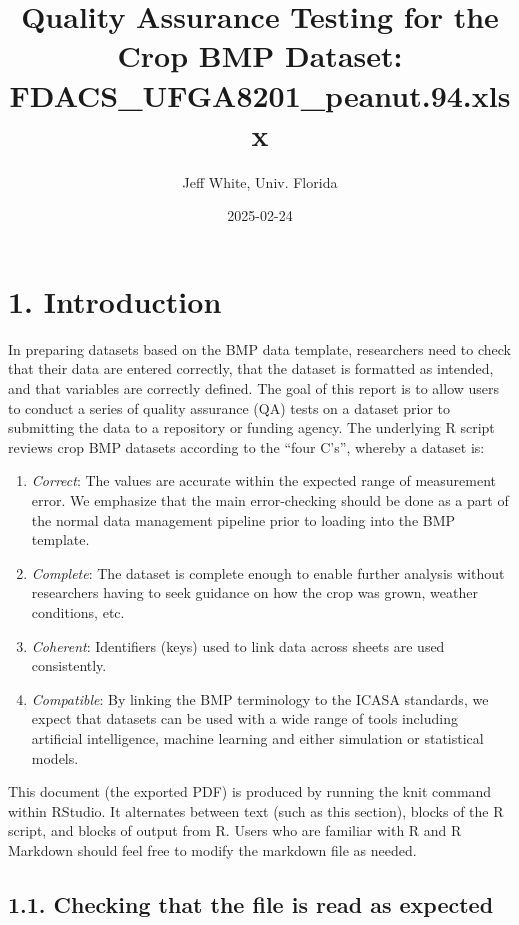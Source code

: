 \documentclass[
]{article}
\title{\textbf{Quality Assurance Testing for the Crop BMP Dataset:
FDACS\_UFGA8201\_peanut.94.xlsx}}
\author{Jeff White, Univ. Florida}
\date{2025-02-24}
\providecommand{\tightlist}{%
  \setlength{\itemsep}{0pt}\setlength{\parskip}{0pt}}
\begin{document}
\maketitle

\section{1. Introduction}\label{introduction}

In preparing datasets based on the BMP data template, researchers need
to check that their data are entered correctly, that the dataset is
formatted as intended, and that variables are correctly defined. The
goal of this report is to allow users to conduct a series of quality
assurance (QA) tests on a dataset prior to submitting the data to a
repository or funding agency. The underlying R script reviews crop BMP
datasets according to the ``four C's'', whereby a dataset is:

\begin{enumerate}
\def\labelenumi{\arabic{enumi}.}
\tightlist
\item
  \emph{Correct}: The values are accurate within the expected range of
  measurement error. We emphasize that the main error-checking should be
  done as a part of the normal data management pipeline prior to loading
  into the BMP template.
\item
  \emph{Complete}: The dataset is complete enough to enable further
  analysis without researchers having to seek guidance on how the crop
  was grown, weather conditions, etc.
\item
  \emph{Coherent}: Identifiers (keys) used to link data across sheets
  are used consistently.
\item
  \emph{Compatible}: By linking the BMP terminology to the ICASA
  standards, we expect that datasets can be used with a wide range of
  tools including artificial intelligence, machine learning and either
  simulation or statistical models.
\end{enumerate}

This document (the exported PDF) is produced by running the knit command
within RStudio. It alternates between text (such as this section),
blocks of the R script, and blocks of output from R. Users who are
familiar with R and R Markdown should feel free to modify the markdown
file as needed.

\subsection{1.1. Checking that the file is read as
expected}\label{checking-that-the-file-is-read-as-expected}
\end{document}

